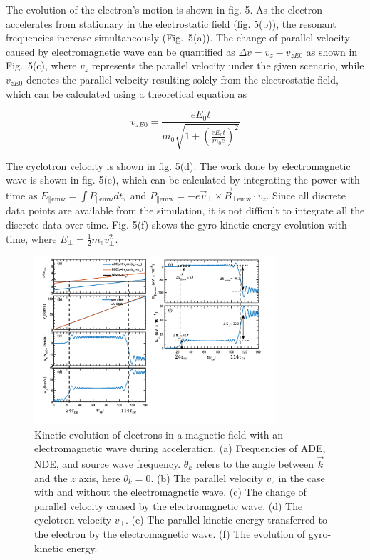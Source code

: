 \documentclass{cpbtex3}
\begin{document}
\vspace{1em}

The evolution of the electron’s motion is shown in fig. 5. As the electron accelerates from stationary in the electrostatic field (fig. 5(b)), the resonant frequencies increase simultaneously (Fig.~5(a)). The change of parallel velocity caused by electromagnetic wave can be quantified as \( \Delta v = v_z - v_{zE0} \) as shown in Fig.~5(c), where \( v_z \) represents the parallel velocity under the given scenario, while \( v_{zE0} \) denotes the parallel velocity resulting solely from the electrostatic field, which can be calculated using a theoretical equation as

\begin{equation}
v_{zE0} = \frac{e E_0 t}{m_0 \sqrt{1 + \left( \frac{e E_0 t}{m_0 c} \right)^2 }}
\end{equation}

\vspace{1em}

The cyclotron velocity is shown in fig. 5(d). The work done by electromagnetic wave is shown in fig. 5(e), which can be calculated by integrating the power with time as 
\(
E_{\parallel \text{emw}} = \int P_{\parallel \text{emw}} dt ,
\)
and 
\(
P_{\parallel \text{emw}} = -e \vec{v}_\perp \times \vec{B}_{\perp \text{emw}} \cdot v_z.
\)
Since all discrete data points are available from the simulation, it is not difficult to integrate all the discrete data over time. Fig. 5(f) shows the gyro-kinetic energy evolution with time, where 
\(
E_\perp = \frac{1}{2} m_e v_\perp^2.
\)

\begin{figure}[ht]
\centering
\includegraphics[width=0.8\textwidth]{Figure5.pdf}%
\caption{\label{fig:NumSim}Kinetic evolution of electrons in a magnetic field with an electromagnetic wave during acceleration. 
    (a) Frequencies of ADE, NDE, and source wave frequency. $\theta_k$ refers to the angle between $\vec{k}$ and the $z$ axis, here $\theta_k = 0$. 
    (b) The parallel velocity $v_z$ in the case with and without the electromagnetic wave. 
    (c) The change of parallel velocity caused by the electromagnetic wave. 
    (d) The cyclotron velocity $v_\perp$. 
    (e) The parallel kinetic energy transferred to the electron by the electromagnetic wave. 
    (f) The evolution of gyro-kinetic energy.}
    \label{fig:kinetic_evolution}
\end{figure}
\end{document}
